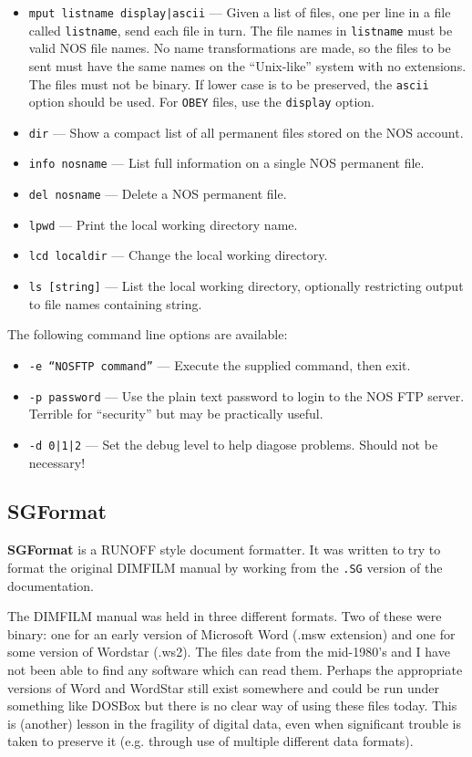 \documentclass[a4paper,twoside,11pt]{article}
\newcommand{\newpara}{\par\vspace{4mm}\noindent}
\newcommand{\textttc}[1]{\texttt{\textcolor{OurRed}{#1}}}
\begin{document}
\begin{itemize}
\item \textttc{mput listname display|ascii} ---  Given a list of files, one per line in a file called
  \texttt{listname}, send each file in turn. The file names in \texttt{listname} must be valid NOS file names.
  No name transformations are made, so the files to be sent must have the same names on the ``Unix-like''
  system with no extensions. The files must not be binary. If lower case is to be preserved, the \texttt{ascii}
  option should be used. For \texttt{OBEY} files, use the \texttt{display} option.
\item \textttc{dir} --- Show a compact list of all permanent files stored on the NOS account.
\item \textttc{info nosname} --- List full information on a single NOS permanent file.
\item \textttc{del nosname} --- Delete a NOS permanent file.
\item \textttc{lpwd} --- Print the local working directory name.
\item \textttc{lcd localdir} --- Change the local working directory.
\item \textttc{ls [string]} --- List the local working directory, optionally restricting output
  to file names containing string.
\end{itemize}

\newpara
The following command line options are available:
\begin{itemize}
\item \textttc{-e ``NOSFTP command''} --- Execute the supplied command, then exit.
\item \textttc{-p password} --- Use the plain text password to login to the NOS FTP server. Terrible
  for ``security'' but may be practically useful.
\item \textttc{-d 0|1|2} --- Set the debug level to help diagose problems. Should not be necessary!
\end{itemize}

\subsection{SGFormat}
\newpara
\textbf{SGFormat} is a RUNOFF style document formatter. It  was written to
try to format the original DIMFILM manual
by working from the \texttt{.SG} version of the documentation.

\newpara
The DIMFILM manual was held in three different formats. Two of these were binary: one for an early
version of Microsoft Word (.msw extension) and one for some version of Wordstar (.ws2). The files date from the
mid-1980's and I have not been able to find any software which can read them. Perhaps the appropriate
versions of Word and WordStar still exist somewhere and could be run under something like DOSBox but
there is no clear way of using these files today. This is (another) lesson in the fragility of
digital data, even when significant trouble is taken to preserve it (e.g. through use of multiple
different data formats).
\end{document}
